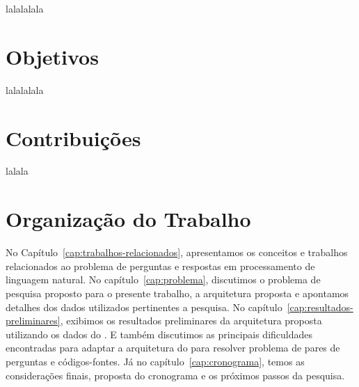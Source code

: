 lalalalala


\section{Objetivos}
\label{sec:objetivo}

lalalalala

\section{Contribuições}
\label{sec:contribucoes}

lalala

\section{Organização do Trabalho}
\label{sec:organizacao_trabalho}

No Capítulo~\ref{cap:trabalhos-relacionados}, apresentamos os conceitos e trabalhos relacionados ao problema de perguntas e respostas em processamento de linguagem natural. No capítulo~\ref{cap:problema}, discutimos o problema de pesquisa proposto para o presente trabalho, a arquitetura proposta e apontamos detalhes dos dados utilizados pertinentes a pesquisa. 
No capítulo~\ref{cap:resultados-preliminares}, exibimos os resultados preliminares da arquitetura proposta utilizando os dados do \cite{yao-2018}. E também discutimos as principais dificuldades encontradas para adaptar a arquitetura do \cite{feng-2015} para resolver problema de pares de perguntas e códigos-fontes. Já no capítulo~\ref{cap:cronograma}, temos as considerações finais, proposta do cronograma e os próximos passos da pesquisa.
